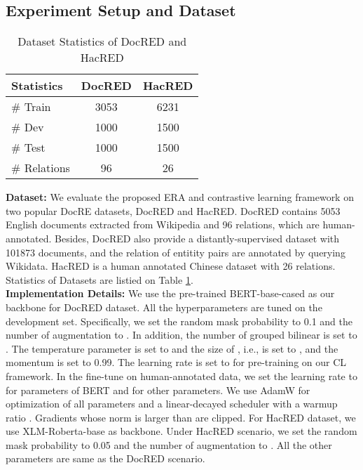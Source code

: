 \documentclass[11pt]{article}
\begin{document}
\subsection{Experiment Setup and Dataset}
   \begin{table}[h]
        \centering
        \begin{tabular}{lcc}
            \toprule

            Statistics & DocRED & HacRED \\
            \midrule
            \# Train & 3053 &6231 \\
            \# Dev &1000 &1500 \\
            \# Test &1000 &1500 \\
            \# Relations &96 &26 \\
            \toprule
        \end{tabular}
        \caption{Dataset Statistics of DocRED and HacRED}
          \label{tb:data-stat}
    \end{table}
    
    \textbf{Dataset:}
   We evaluate the proposed ERA and contrastive learning framework on two popular DocRE datasets, DocRED\citep{yao-etal-2019-docred} and HacRED\citep{cheng-etal-2021-hacred}. DocRED contains 5053 English documents extracted from Wikipedia and 96 relations, which are human-annotated. Besides, DocRED also provide a distantly-supervised dataset with 101873 documents, and the relation of entitity pairs are annotated by querying Wikidata. HacRED is a human annotated Chinese dataset with 26 relations. Statistics of Datasets are listied on Table \ref{tb:data-stat}.  \\
    \textbf{Implementation Details:} We use the pre-trained BERT-base-cased\citep{devlin-etal-2019-bert} as our backbone for DocRED dataset. All the hyperparameters are tuned on the development set. Specifically, we set the random mask probability  to 0.1 and the number of augmentation  to . In addition, the number of grouped bilinear  is set to . The temperature parameter  is set to  and the size of , i.e.,  is set to , and the momentum  is set to 0.99. The learning rate is set to  for pre-training on our CL framework. In the fine-tune on human-annotated data, we set the learning rate to  for parameters of BERT and  for other parameters. We use AdamW\citep{losch_adamw_2019} for optimization of all parameters and a linear-decayed scheduler with a warmup ratio . Gradients whose norm is larger than  are clipped. For HacRED dataset, we use XLM-Roberta-base\citep{conneau-etal-2020-unsupervised} as backbone. Under HacRED scenario, we set the random mask probability  to 0.05 and the number of augmentation  to . All the other parameters are same as the DocRED scenario. 
    
\end{document}
